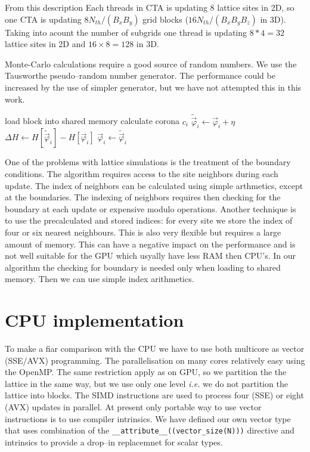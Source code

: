 \documentclass[a4paper]{llncs}
\newcommand{\vphi}{\vec{\varphi}}
\begin{document}
From this description Each threads in CTA is updating 8
lattice sites in 2D, so one CTA is updating $8 N_{th}/(B_x B_y)$ grid
blocks ($16 N_{th}/(B_x B_y B_z)$ in 3D). Taking into acount the number of
subgrids one thread is updating $8*4=32$ lattice sites in 2D and
$16\times 8=128$ in 3D.

Monte-Carlo calculations require a good source of random numbers. We
use the Tausworthe pseudo--random number
generator\cite{howes_thomas07}. The performance could be increased by
the use of simpler generator, but we have not attempted this in this
work.

\begin{algorithm}
\begin{algorithmic}[1]
\State load block  into shared memory
\State calculate corona $c_i$ 
\State $\widetilde{\vphi}_i \gets \vphi_i+\eta$
\State $\Delta H \gets H[\widetilde{\vphi}_i]-H[\vphi_i]$
\State $\vphi_i \gets \widetilde{\vphi}_i$
\EndIf
\EndFor
\EndFor 
{}
\EndFor
\EndFor
\EndFor
\EndFor
\end{algorithmic}
\caption{\label{alg:gpu}}
\end{algorithm}


One of the problems with lattice simulations is the treatment of the
boundary conditions. The algorithm requires access to the site
neighbors during each update. The index of neighbors can be calculated
using simple arthmetics, except at the boundaries. The indexing of
neighbors requires then checking for the boundary at each update or
expensive modulo operations. Another technique is to use the
precalculated and stored indices: for every site we store the index of
four or six nearest neighbours. This is also very flexible but
requires a large amount of memory. This can have a negative impact on
the performance and is not well suitable for the GPU which usyally
have less RAM then CPU's. In our algorithm the checking for boundary
is needed only when loading to shared memory. Then we can use simple
index arithmetics.




\section{CPU implementation}
To make a fiar comparison with the CPU we have to use both multicore
as vector (SSE/AVX) programming.  The parallelisation on many cores
relatively easy using the OpenMP. The same restriction apply as on
GPU, so we partition the the lattice in the same way, but we use only
one level {\em i.e.} we do not partition the lattice into blocks.  The
SIMD instructions are used to process four (SSE) or eight (AVX)
updates in parallel.  At present only portable way to use vector
instructions is to use compiler intrinsics\cite{intr}. We have defined
our own vector type that uses combination of the 
 \lstinline!__attribute__((vector_size(N)))!  directive and intrinsics
to provide a drop--in replacemnet for scalar types.
\end{document}
